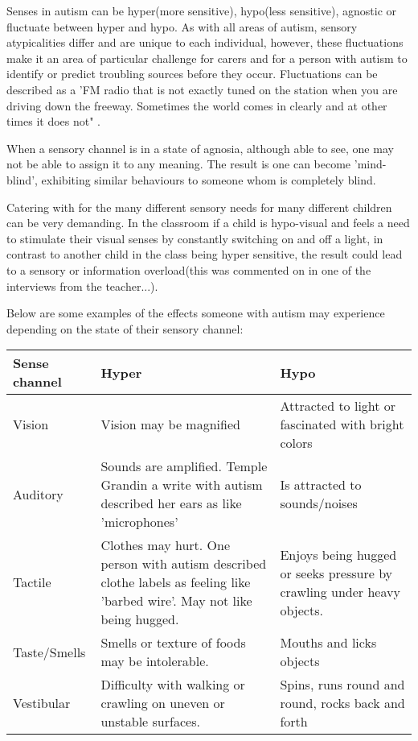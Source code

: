 \documentclass[11pt]{report}
\begin{document}
Senses in autism can be hyper(more sensitive), hypo(less sensitive), agnostic or fluctuate between hyper and hypo\cite{bayes}. As with all areas of autism, sensory atypicalities differ and are unique to each individual, however, these fluctuations make it an area of particular challenge for carers and for a person with autism to identify or predict troubling sources before they occur. Fluctuations can be described as a 'FM radio that is not exactly tuned on the station when you are driving down the freeway. Sometimes the world comes in clearly and at other times it does not" \cite{olgab}.

When a sensory channel is in a state of agnosia, although able to see, one may not be able to assign it to any meaning. The result is one can become 'mind-blind', exhibiting similar behaviours to someone whom is completely blind.

Catering with for the many different sensory needs for many different children can be very demanding. In the classroom if a child is hypo-visual and feels a need to stimulate their visual senses by constantly switching on and off a light, in contrast to another child in the class being hyper sensitive, the result could lead to a sensory or information overload(this was commented on in one of the interviews from the teacher...).

Below are some examples of the effects someone with autism may experience depending on the state of their sensory channel:

\begin{table}
    \begin{tabular}{| l | p{5cm} | p{5cm} |}
    \hline
    Sense channel & Hyper                                                                                                                      & Hypo                                                                   \\
    \hline
    \hline
    Vision        & Vision may be magnified                                                                                                    & Attracted to light or fascinated with bright colors                    \\
    \hline
    Auditory      & Sounds are amplified. Temple Grandin a write with autism described her ears as like 'microphones'                          & Is attracted to sounds/noises                                          \\
    \hline
    Tactile       & Clothes may hurt. One person with autism described clothe labels as feeling like 'barbed wire'. May not like being hugged. & Enjoys being hugged or seeks pressure by crawling under heavy objects. \\
    \hline
    Taste/Smells & Smells or texture of foods may be intolerable. & Mouths and licks objects \\
    \hline
    Vestibular & Difficulty with walking or crawling on uneven or unstable surfaces. & Spins, runs round and round, rocks back and forth \\
    \hline
    \end{tabular}
\end{table}
\end{document}
